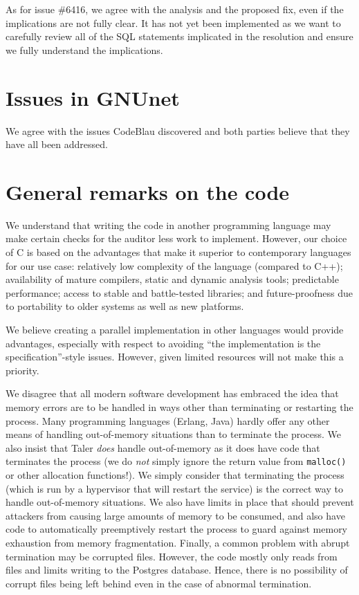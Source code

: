\documentclass[11pt]{article}
\begin{document}
As for issue \#6416, we agree with the analysis and the proposed fix, even if
the implications are not fully clear. It has not yet been implemented as we
want to carefully review all of the SQL statements implicated in the
resolution and ensure we fully understand the implications.

\section{Issues in GNUnet}

We agree with the issues CodeBlau discovered and both parties believe that
they have all been addressed.

\section{General remarks on the code}

We understand that writing the code in another programming language may make
certain checks for the auditor less work to implement. However, our choice of C
is based on the advantages that make it superior to contemporary languages for
our use case:  relatively low complexity of the language (compared to C++);
availability of mature compilers, static and dynamic analysis tools;
predictable performance; access to stable and battle-tested libraries; and
future-proofness due to portability to older systems as well as new platforms.

We believe creating a parallel implementation in other languages would provide
advantages, especially with respect to avoiding ``the implementation is the
specification''-style issues.  However, given limited resources will not make
this a priority.

We disagree that all modern software development has embraced the idea that
memory errors are to be handled in ways other than terminating or restarting
the process. Many programming languages (Erlang, Java) hardly offer any other
means of handling out-of-memory situations than to terminate the process. We
also insist that Taler {\em does} handle out-of-memory as it does have code
that terminates the process (we do {\em not} simply ignore the return value
from {\tt malloc()} or other allocation functions!). We simply consider that
terminating the process (which is run by a hypervisor that will restart the
service) is the correct way to handle out-of-memory situations.  We also have
limits in place that should prevent attackers from causing large amounts of
memory to be consumed, and also have code to automatically preemptively
restart the process to guard against memory exhaustion from memory
fragmentation.  Finally, a common problem with abrupt termination may be
corrupted files.  However, the code mostly only reads from files and limits
writing to the Postgres database. Hence, there is no possibility of corrupt
files being left behind even in the case of abnormal termination.
\end{document}
